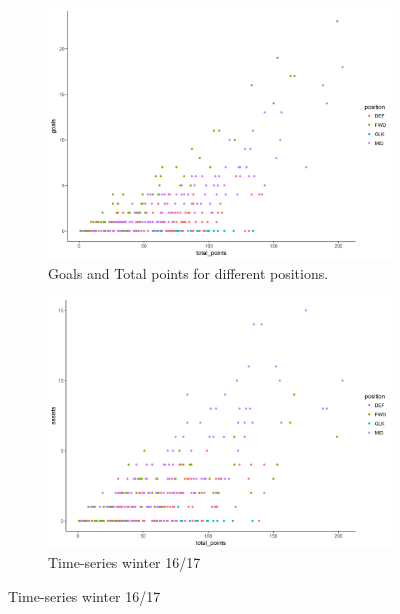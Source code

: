\begin{figure}[H]
\centering
\begin{subfigure}{.5\textwidth}
  \centering
  \includegraphics[width=.9\linewidth]{fig/chapter_6/goals_tot_poins.png}
  \caption{Goals and Total points for different positions.}
  \label{fig:goal_tot_p}
\end{subfigure}%
\begin{subfigure}{.5\textwidth}
  \centering
  \includegraphics[width=.9\linewidth]{fig/chapter_6/assists_tot_poins.png}
  \caption{Time-series winter 16/17}
  \label{fig:assist_tot_p}
\end{subfigure}
\end{figure}




